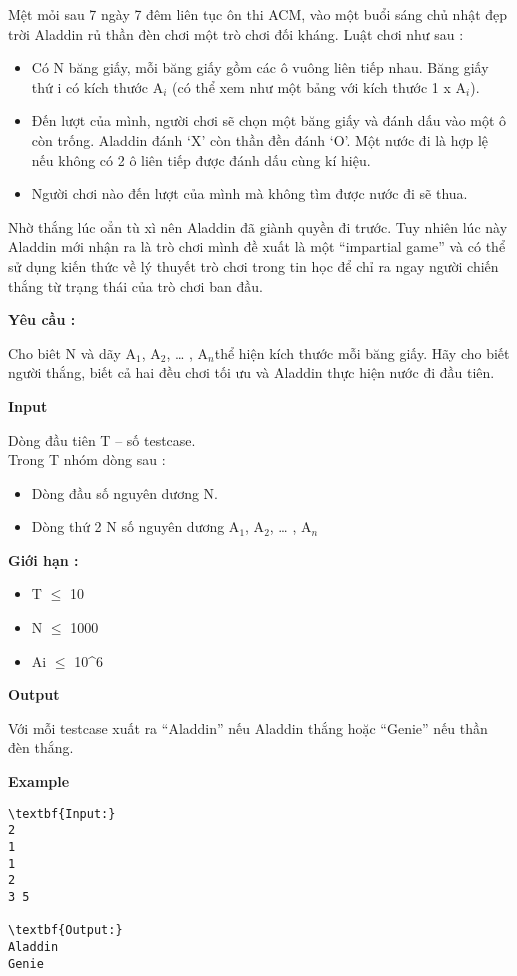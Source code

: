 

Mệt mỏi sau 7 ngày 7 đêm liên tục ôn thi ACM, vào một buổi sáng chủ nhật đẹp trời Aladdin rủ thần đèn chơi một trò chơi đối kháng. Luật chơi như sau :
\begin{itemize}
	\item Có N băng giấy, mỗi băng giấy gồm các ô vuông liên tiếp nhau. Băng giấy thứ i có kích thước A$_i$ (có thể xem như một bảng với kích thước 1 x A$_i$).
	\item Đến lượt của mình, người chơi sẽ chọn một băng giấy và đánh dấu vào một ô còn trống. Aladdin đánh ‘X’ còn thần đền đánh ‘O’. Một nước đi là hợp lệ nếu không có 2 ô liên tiếp được đánh dấu cùng kí hiệu.
	\item Người chơi nào đến lượt của mình mà không tìm được nước đi sẽ thua.
\end{itemize}

Nhờ thắng lúc oẳn tù xì nên Aladdin đã giành quyền đi trước. Tuy nhiên lúc này Aladdin mới nhận ra là trò chơi mình đề xuất là một “impartial game” và có thể sử dụng kiến thức về lý thuyết trò chơi trong tin học để chỉ ra ngay người chiến thắng từ trạng thái của trò chơi ban đầu.

\textbf{Yêu cầu :}

Cho biêt N và dãy A$_1$, A$_2$, … , A$_n $thể hiện kích thước mỗi băng giấy. Hãy cho biết người thắng, biết cả hai đều chơi tối ưu và Aladdin thực hiện nước đi đầu tiên.

\textbf{Input}

Dòng đầu tiên T – số testcase.
\\Trong T nhóm dòng sau :
\begin{itemize}
	\item Dòng đầu số nguyên dương N.
	\item Dòng thứ 2 N số nguyên dương A$_1$, A$_2$, … , A$_n$
\end{itemize}

\textbf{Giới hạn : }
\begin{itemize}
	\item T  $\le$  10
	\item N  $\le$  1000
	\item Ai  $\le$  10^6
\end{itemize}

\textbf{Output}

Với mỗi testcase xuất ra “Aladdin” nếu Aladdin thắng hoặc “Genie” nếu thần đèn thắng.

\textbf{Example}
\begin{verbatim}
\textbf{Input:}
2
1
1
2
3 5

\textbf{Output:}
Aladdin
Genie\end{verbatim}
